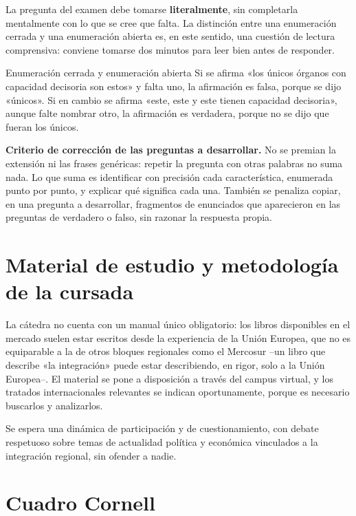 \documentclass[12pt,oneside]{book}
\begin{document}
La pregunta del examen debe tomarse \textbf{literalmente}, sin completarla mentalmente con lo que se cree que falta. La distinción entre una enumeración cerrada y una enumeración abierta es, en este sentido, una cuestión de lectura comprensiva: conviene tomarse dos minutos para leer bien antes de responder.

\begin{ejemplo}{Enumeración cerrada y enumeración abierta}
Si se afirma «los únicos órganos con capacidad decisoria son estos» y falta uno, la afirmación es falsa, porque se dijo «únicos». Si en cambio se afirma «este, este y este tienen capacidad decisoria», aunque falte nombrar otro, la afirmación es verdadera, porque no se dijo que fueran los únicos.
\end{ejemplo}

\begin{importante}
\textbf{Criterio de corrección de las preguntas a desarrollar.} No se premian la extensión ni las frases genéricas: repetir la pregunta con otras palabras no suma nada. Lo que suma es identificar con precisión cada característica, enumerada punto por punto, y explicar qué significa cada una. También se penaliza copiar, en una pregunta a desarrollar, fragmentos de enunciados que aparecieron en las preguntas de verdadero o falso, sin razonar la respuesta propia.
\end{importante}

\section{Material de estudio y metodología de la cursada}

La cátedra no cuenta con un manual único obligatorio: los libros disponibles en el mercado suelen estar escritos desde la experiencia de la Unión Europea, que no es equiparable a la de otros bloques regionales como el Mercosur --un libro que describe «la integración» puede estar describiendo, en rigor, solo a la Unión Europea--. El material se pone a disposición a través del campus virtual, y los tratados internacionales relevantes se indican oportunamente, porque es necesario buscarlos y analizarlos.

Se espera una dinámica de participación y de cuestionamiento, con debate respetuoso sobre temas de actualidad política y económica vinculados a la integración regional, sin ofender a nadie.

\section{Cuadro Cornell}
\end{document}
